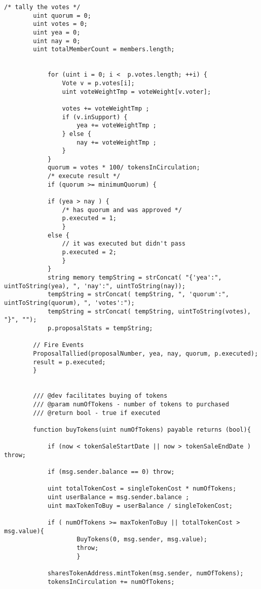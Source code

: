 \documentclass{article}
\begin{document}
\begin{lstlisting}[style=MyCStyle]
            /* tally the votes */
        uint quorum = 0;
        uint votes = 0;
        uint yea = 0;
        uint nay = 0;
        uint totalMemberCount = members.length;


            for (uint i = 0; i <  p.votes.length; ++i) {
                Vote v = p.votes[i];
                uint voteWeightTmp = voteWeight[v.voter];

                votes += voteWeightTmp ;
                if (v.inSupport) {
                    yea += voteWeightTmp ;
                } else {
                    nay += voteWeightTmp ;
                }
            }
            quorum = votes * 100/ tokensInCirculation;
            /* execute result */
            if (quorum >= minimumQuorum) {

            if (yea > nay ) {
                /* has quorum and was approved */
                p.executed = 1;
                }
            else {
                // it was executed but didn't pass
                p.executed = 2;
                }
            }
            string memory tempString = strConcat( "{'yea':", uintToString(yea), ", 'nay':", uintToString(nay));
            tempString = strConcat( tempString, ", 'quorum':", uintToString(quorum), ", 'votes':");
            tempString = strConcat( tempString, uintToString(votes), "}", "");
            p.proposalStats = tempString;

        // Fire Events
        ProposalTallied(proposalNumber, yea, nay, quorum, p.executed);
        result = p.executed;
        }


        /// @dev facilitates buying of tokens
        /// @param numOfTokens - number of tokens to purchased
        /// @return bool - true if executed

        function buyTokens(uint numOfTokens) payable returns (bool){

            if (now < tokenSaleStartDate || now > tokenSaleEndDate ) throw;

            if (msg.sender.balance == 0) throw;

            uint totalTokenCost = singleTokenCost * numOfTokens;
            uint userBalance = msg.sender.balance ;
            uint maxTokenToBuy = userBalance / singleTokenCost;

            if ( numOfTokens >= maxTokenToBuy || totalTokenCost > msg.value){
                    BuyTokens(0, msg.sender, msg.value);
                    throw;
                    }

            sharesTokenAddress.mintToken(msg.sender, numOfTokens);
            tokensInCirculation += numOfTokens;


\end{lstlisting}
\end{document}
